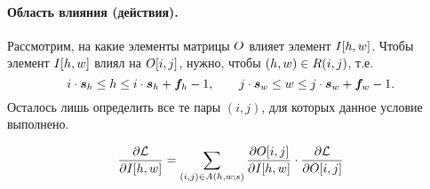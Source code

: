 \documentclass{book}
\numberwithin{theorem}{chapter}
\numberwithin{statement}{chapter}
\numberwithin{lemma}{chapter}
\theoremstyle{definition}
\numberwithin{task}{chapter}
\theoremstyle{remark}
\numberwithin{example}{chapter}
\theoremstyle{definition}
\numberwithin{definition}{chapter}
\theoremstyle{remark}
\theoremstyle{remark}
\numberwithin{lyrics}{section}
\begin{document}
\paragraph{Область влияния (действия).}
Рассмотрим, на какие элементы матрицы $O$ влияет элемент $I[h, w]$. Чтобы элемент $I[h, w]$ влиял на $O[i, j]$, нужно, чтобы $(h, w) \in R(i, j)$, т.е.
\begin{equation}
i \cdot \boldsymbol{s}_h \le h \le i \cdot \boldsymbol{s}_h + \boldsymbol{f}_h - 1, \qquad j \cdot \boldsymbol{s}_w \le w \le j \cdot \boldsymbol{s}_w + \boldsymbol{f}_w - 1.
\end{equation}
Осталось лишь определить все те пары $(i, j)$, для которых данное условие выполнено. 



\begin{equation}
\frac{\partial \mathcal{L} }{\partial I[h, w]}= \sum\limits_{(i, j) \in A(h, w; s)} 
\frac{\partial O[i, j] }{\partial I[h, w]} \cdot \frac{\partial \mathcal{L} }{\partial O[i, j]}
\end{equation}




\end{document}
